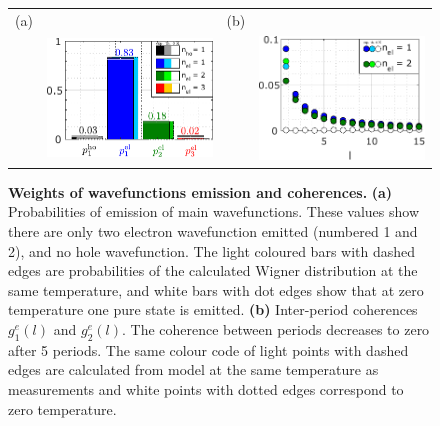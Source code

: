 \begin{figure}[hptb]
	\begin{center}
		\begin{tabular}{c c c c}
			(a) & & (b) &  \\ 
			
			& \includegraphics[width = 6.5cm]{./chap1/JnlData_leviton_40ps_1e_51mK_Projected_Gradient_Method_a} &
			& \includegraphics[width = 6.5cm]{./chap1/JnlData_leviton_40ps_1e_51mK_Projected_Gradient_Method_b}
		\end{tabular} 
	\end{center}
	\caption{\textbf{Weights of wavefunctions emission and coherences.} \textbf{(a)} Probabilities of emission of main wavefunctions. These values show there are only two electron wavefunction emitted (numbered 1 and 2), and no hole wavefunction. The light coloured bars with dashed edges are probabilities of the calculated Wigner distribution at the same temperature, and white bars with dot edges show that at zero temperature one pure state is emitted. \textbf{(b)} Inter-period coherences $g_{1}^{e}(l)$ and $g_{2}^{e}(l)$.%
	The coherence between periods decreases to zero after 5 periods. The same colour code of light points with dashed edges are calculated from model at the same temperature as measurements and white points with dotted edges correspond to zero temperature.}
	\label{fig: Jnl du 1e 40ps}
\end{figure}

